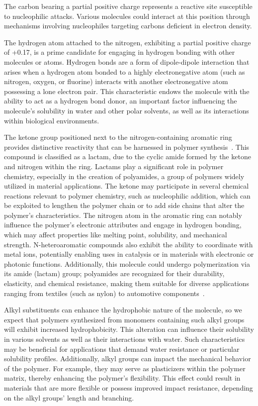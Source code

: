 The carbon bearing a partial positive charge represents a reactive site susceptible to nucleophilic attacks. Various molecules could interact at this position through mechanisms involving nucleophiles targeting carbons deficient in electron density.

The hydrogen atom attached to the nitrogen, exhibiting a partial positive charge of +0.17, is a prime candidate for engaging in hydrogen bonding with other molecules or atoms. Hydrogen bonds are a form of dipole-dipole interaction that arises when a hydrogen atom bonded to a highly electronegative atom (such as nitrogen, oxygen, or fluorine) interacts with another electronegative atom possessing a lone electron pair. This characteristic endows the molecule with the ability to act as a hydrogen bond donor, an important factor influencing the molecule’s solubility in water and other polar solvents, as well as its interactions within biological environments.

The ketone group positioned next to the nitrogen-containing aromatic ring provides distinctive reactivity that can be harnessed in polymer synthesis~\cite{McQuarrieSimonPhysicalChemistry,CareySundbergAdvancedOrganicChemistry,Varghese2022BeyondApplications,Varghese2022BeyondApplications}. This compound is classified as a lactam, due to the cyclic amide formed by the ketone and nitrogen within the ring. Lactams play a significant role in polymer chemistry, especially in the creation of polyamides, a group of polymers widely utilized in material applications. The ketone may participate in several chemical reactions relevant to polymer chemistry, such as nucleophilic addition, which can be exploited to lengthen the polymer chain or to add side chains that alter the polymer’s characteristics. The nitrogen atom in the aromatic ring can notably influence the polymer’s electronic attributes and engage in hydrogen bonding, which may affect properties like melting point, solubility, and mechanical strength. N-heteroaromatic compounds also exhibit the ability to coordinate with metal ions, potentially enabling uses in catalysis or in materials with electronic or photonic functions. Additionally, this molecule could undergo polymerization via its amide (lactam) group; polyamides are recognized for their durability, elasticity, and chemical resistance, making them suitable for diverse applications ranging from textiles (such as nylon) to automotive components~\cite{Varghese2022BeyondApplications,Varghese2022BeyondApplications}.

Alkyl substituents can enhance the hydrophobic nature of the molecule, so we expect that polymers synthesized from monomers containing such alkyl groups will exhibit increased hydrophobicity. This alteration can influence their solubility in various solvents as well as their interactions with water. Such characteristics may be beneficial for applications that demand water resistance or particular solubility profiles. Additionally, alkyl groups can impact the mechanical behavior of the polymer. For example, they may serve as plasticizers within the polymer matrix, thereby enhancing the polymer's flexibility. This effect could result in materials that are more flexible or possess improved impact resistance, depending on the alkyl groups' length and branching.

